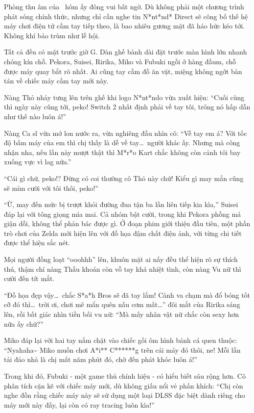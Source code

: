 \documentclass[../main.tex]{subfiles}
\begin{document}
Phòng thu âm của \hll\ hôm ấy đông vui bất ngờ. Dù không phải một chương trình phát sóng chính thức, nhưng chỉ cần nghe tin N*nt*nd* Direct sẽ công bố thế hệ máy chơi điện tử cầm tay tiếp theo, là bao nhiêu gương mặt đã háo hức kéo tới. Không khí bảo trùm như lễ hội.

Tất cả đều có mặt trước giờ G. Dàn ghế bành dài đặt trước màn hình lớn nhanh chóng kín chỗ. Pekora, Suisei, Ririka, Miko và Fubuki ngồi ở hàng đầum, chỗ được máy quay bắt rõ nhất. Ai cũng tay cầm đồ ăn vặt, miệng không ngớt bàn tán về chiếc máy cầm tay mới này.

Nàng Thỏ nhảy tưng lên trên ghế khi logo N*nt*ndo vừa xuất hiện: ``Cuối cùng thì ngày này cũng tới, peko! Switch 2 nhất định phải về tay tôi, trông nó hấp dẫn như thế nào luôn á!''

Nàng Ca sĩ vừa mở lon nước ra, vừa nghiêng đầu nhìn cô: ``Về tay em á? Với tốc độ bấm máy của em thì chị thấy là dễ về tay\dots\ người khác ấy. Nhưng mà công nhận nha, nếu lần này mượt thật thì M*r*o Kart chắc không còn cảnh tôi bay xuống vực vì lag nữa.''

``Cái gì chứ, peko!? Đừng có coi thường cô Thỏ này chứ! Kiểu gì may mắn cũng sẽ mỉm cười với tôi thôi, peko!''

``Ừ, may đến mức bị trượt khỏi đường đua tận ba lần liên tiếp kia kìa,'' Suisei đáp lại với tông giọng mỉa mai.
Cả nhóm bật cười, trong khi Pekora phồng má giận dỗi, không thể phản bác được gì. Ở đoạn phim giới thiệu đầu tiên, một phần trò chơi của Zelda mới hiện lên với đồ họa đậm chất điện ảnh, với từng chi tiết được thể hiện sắc nét.

Mọi người đồng loạt ``ooohhh'' lên, khuôn mặt ai nấy đều thể hiện rõ sự thích thú, thậm chí nàng Thầu khoán %
còn vỗ tay khá nhiệt tình, còn nàng Vu nữ thì cười đến tít mắt.

``Đồ họa đẹp vậy\dots\ chắc S*a*h Bros sẽ đã tay lắm! Cảnh va chạm mà đổ bóng tốt cỡ đó thì\dots\ trời ơi, chơi mê mẩn quên nấu cơm mất\dots'' đôi mắt của Ririka sáng lên, rồi bất giác nhìn tiền bối vu nữ: ``Mà mấy nhân vật nữ chắc còn sexy hơn nữa ấy chứ?''

Miko đáp lại với hai tay nắm chặt vào chiếc gối ôm hình bánh cá quen thuộc: ``Nyahaha\~{} Miko muốn chơi A*i** C******g trên cái máy đó thôi, ne! Mỗi lần tải đảo nhà là chị mất năm phút đó, chờ đến phát khóc luôn á!''

Trong khi đó, Fubuki - một game thủ chính hiệu - có hiểu biết sâu rộng hơn. Cô phân tích cặn kẽ với chiếc máy mới, dù không giấu nổi vẻ phấn khích: ``Chị còn nghe đồn rằng chiếc máy này sẽ sử dụng một loại DLSS đặc biệt dành riêng cho máy mới này đấy, lại còn có ray tracing luôn kìa!''
\end{document}
